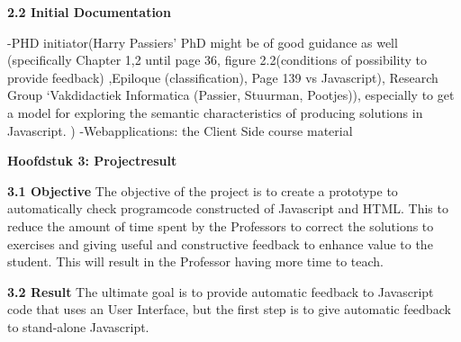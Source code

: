 \documentclass{article}
\begin{document}
\textbf{2.2 Initial Documentation}

\noindent
-PHD initiator(Harry Passiers’ PhD might be of good guidance as well (specifically Chapter 1,2 until page 36, figure 2.2(conditions of possibility to provide feedback) ,Epiloque (classification), Page 139 vs Javascript), Research Group ‘Vakdidactiek Informatica (Passier, Stuurman, Pootjes)), especially to get a model for exploring the semantic characteristics of producing solutions in Javascript. )
\newline-Webapplications: the Client Side course material
\newline

\textbf{Hoofdstuk 3: Projectresult}
\newline

\noindent
\textbf{3.1 Objective}
\newline
The objective of the project is to create a prototype to automatically check programcode constructed of Javascript and HTML. This to reduce the amount of time spent by the Professors to correct the solutions to exercises and giving useful and constructive feedback to enhance value to the student. 
This will result in the Professor having more time to teach. 
\newline

\noindent
\textbf{3.2 Result}
\newline
The ultimate goal is to provide automatic feedback to Javascript code that uses an User Interface, but the first step is to give automatic feedback to stand-alone Javascript.
\newline
\end{document}
